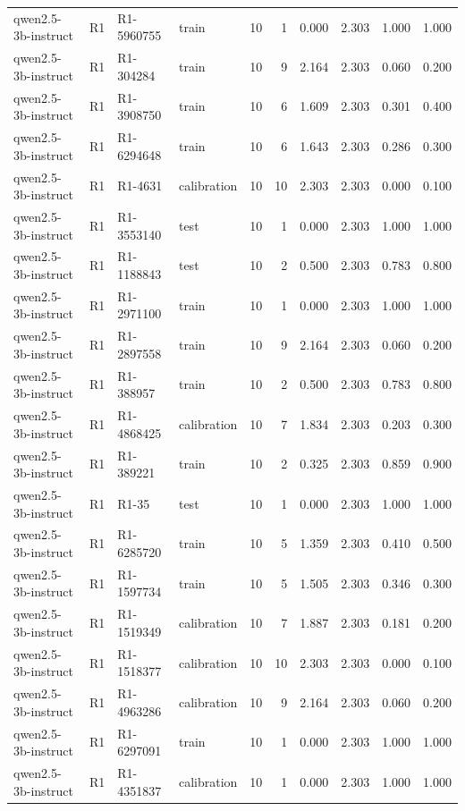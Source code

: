 \begin{table}
\begin{tabular}{llllrrrrrr}
qwen2.5-3b-instruct & R1 & R1-5960755 & train & 10 & 1 & 0.000 & 2.303 & 1.000 & 1.000 \\
qwen2.5-3b-instruct & R1 & R1-304284 & train & 10 & 9 & 2.164 & 2.303 & 0.060 & 0.200 \\
qwen2.5-3b-instruct & R1 & R1-3908750 & train & 10 & 6 & 1.609 & 2.303 & 0.301 & 0.400 \\
qwen2.5-3b-instruct & R1 & R1-6294648 & train & 10 & 6 & 1.643 & 2.303 & 0.286 & 0.300 \\
qwen2.5-3b-instruct & R1 & R1-4631 & calibration & 10 & 10 & 2.303 & 2.303 & 0.000 & 0.100 \\
qwen2.5-3b-instruct & R1 & R1-3553140 & test & 10 & 1 & 0.000 & 2.303 & 1.000 & 1.000 \\
qwen2.5-3b-instruct & R1 & R1-1188843 & test & 10 & 2 & 0.500 & 2.303 & 0.783 & 0.800 \\
qwen2.5-3b-instruct & R1 & R1-2971100 & train & 10 & 1 & 0.000 & 2.303 & 1.000 & 1.000 \\
qwen2.5-3b-instruct & R1 & R1-2897558 & train & 10 & 9 & 2.164 & 2.303 & 0.060 & 0.200 \\
qwen2.5-3b-instruct & R1 & R1-388957 & train & 10 & 2 & 0.500 & 2.303 & 0.783 & 0.800 \\
qwen2.5-3b-instruct & R1 & R1-4868425 & calibration & 10 & 7 & 1.834 & 2.303 & 0.203 & 0.300 \\
qwen2.5-3b-instruct & R1 & R1-389221 & train & 10 & 2 & 0.325 & 2.303 & 0.859 & 0.900 \\
qwen2.5-3b-instruct & R1 & R1-35 & test & 10 & 1 & 0.000 & 2.303 & 1.000 & 1.000 \\
qwen2.5-3b-instruct & R1 & R1-6285720 & train & 10 & 5 & 1.359 & 2.303 & 0.410 & 0.500 \\
qwen2.5-3b-instruct & R1 & R1-1597734 & train & 10 & 5 & 1.505 & 2.303 & 0.346 & 0.300 \\
qwen2.5-3b-instruct & R1 & R1-1519349 & calibration & 10 & 7 & 1.887 & 2.303 & 0.181 & 0.200 \\
qwen2.5-3b-instruct & R1 & R1-1518377 & calibration & 10 & 10 & 2.303 & 2.303 & 0.000 & 0.100 \\
qwen2.5-3b-instruct & R1 & R1-4963286 & calibration & 10 & 9 & 2.164 & 2.303 & 0.060 & 0.200 \\
qwen2.5-3b-instruct & R1 & R1-6297091 & train & 10 & 1 & 0.000 & 2.303 & 1.000 & 1.000 \\
qwen2.5-3b-instruct & R1 & R1-4351837 & calibration & 10 & 1 & 0.000 & 2.303 & 1.000 & 1.000 \\

\end{tabular}
\end{table}
